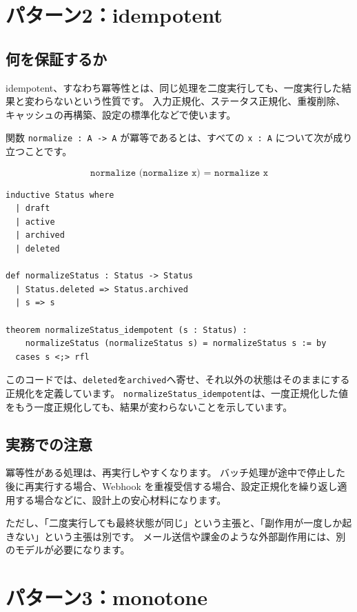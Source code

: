 \section{パターン2：idempotent}

\subsection{何を保証するか}

idempotent、すなわち冪等性とは、同じ処理を二度実行しても、一度実行した結果と変わらないという性質です。
入力正規化、ステータス正規化、重複削除、キャッシュの再構築、設定の標準化などで使います。

関数 \texttt{normalize : A -> A} が冪等であるとは、すべての \texttt{x : A} について次が成り立つことです。

\[
\texttt{normalize (normalize x) = normalize x}
\]

\begin{listing}[htbp]
\begin{verbatim}
inductive Status where
  | draft
  | active
  | archived
  | deleted

def normalizeStatus : Status -> Status
  | Status.deleted => Status.archived
  | s => s

theorem normalizeStatus_idempotent (s : Status) :
    normalizeStatus (normalizeStatus s) = normalizeStatus s := by
  cases s <;> rfl
\end{verbatim}
\caption{\texttt{normalizeStatus\_idempotent}}
\label{lst:appc_idempotent}
\end{listing}

このコードでは、\texttt{deleted}を\texttt{archived}へ寄せ、それ以外の状態はそのままにする正規化を定義しています。
\texttt{normalizeStatus\_idempotent}は、一度正規化した値をもう一度正規化しても、結果が変わらないことを示しています。

\subsection{実務での注意}

冪等性がある処理は、再実行しやすくなります。
バッチ処理が途中で停止した後に再実行する場合、Webhook を重複受信する場合、設定正規化を繰り返し適用する場合などに、設計上の安心材料になります。

ただし、「二度実行しても最終状態が同じ」という主張と、「副作用が一度しか起きない」という主張は別です。
メール送信や課金のような外部副作用には、別のモデルが必要になります。

\section{パターン3：monotone}

